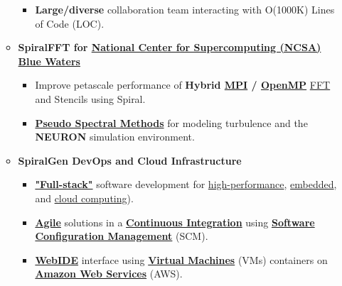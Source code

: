 \documentclass{article}
\begin{document}
\begin{itemize}
\begin{itemize}
\begin{itemize}
          \item \textbf{Large/diverse} collaboration team interacting with O(1000K) Lines of Code (LOC). 
        \end{itemize}

      \item \textbf{SpiralFFT for \href{http://www.ncsa.illinois.edu}{National Center for Supercomputing  (NCSA)} \href{http://www.ncsa.illinois.edu/enabling/bluewaters}{Blue Waters}}

        \begin{itemize}

          \item Improve petascale performance of \textbf{Hybrid \href{http://en.wikipedia.org/wiki/Message_Passing_Interface}{MPI} / \href{http://en.wikipedia.org/wiki/OpenMP}{OpenMP}} \href{https://en.wikipedia.org/wiki/Fast_Fourier_transform}{FFT} and Stencils using Spiral.

          \item \textbf{\href{https://en.wikipedia.org/wiki/Pseudo-spectral_method}{Pseudo Spectral Methods}} for modeling turbulence and the \textbf{NEURON} simulation environment. 

        \end{itemize}

    \item \textbf{SpiralGen DevOps and Cloud Infrastructure}

      \begin{itemize}

        \item \textbf{\href{https://www.google.com/search?q=full+stack+software&oq=full+stack+software&aqs=chrome..69i57.2623j0j7&sourceid=chrome&es_sm=122&ie=UTF-8}{"Full-stack"}} software development for \href{https://en.wikipedia.org/wiki/Supercomputer}{high-performance}, \href{https://en.wikipedia.org/wiki/Embedded_system}{embedded}, and \href{https://en.wikipedia.org/wiki/Cloud_computing}{cloud computing}). 

        \item \textbf{\href{https://en.wikipedia.org/wiki/Agile_software_development}{Agile}} solutions in a \textbf{\href{http://en.wikipedia.org/wiki/Continuous_integration}{Continuous Integration}} using \textbf{\href{https://en.wikipedia.org/wiki/Software_configuration_management}{Software Configuration Management}} (SCM).

        \item \textbf{\href{https://dzone.com/articles/who-needs-online-ide}{WebIDE}} interface using \textbf{\href{https://en.wikipedia.org/wiki/Virtual_machine}{Virtual Machines}} (VMs) containers on \textbf{\href{https://en.wikipedia.org/wiki/Amazon_Web_Services}{Amazon Web Services}} (AWS).  


\end{itemize}
\end{itemize}
\end{itemize}
\end{document}
